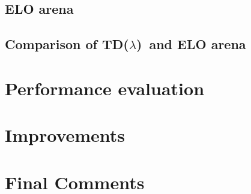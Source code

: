 \documentclass[11pt]{article}
\newcommand{\tdl}{TD($\lambda$)}
\begin{document}
\subsection{ELO arena}
\label{sub:elo_arena}

\subsection{Comparison of \tdl\ and ELO arena}
\label{sub:comparing_learning}

\section{Performance evaluation}
\label{sec:performance}

\section{Improvements}
\label{sec:improvements}

\section{Final Comments}
\label{sec:final_comments}




\end{document}

